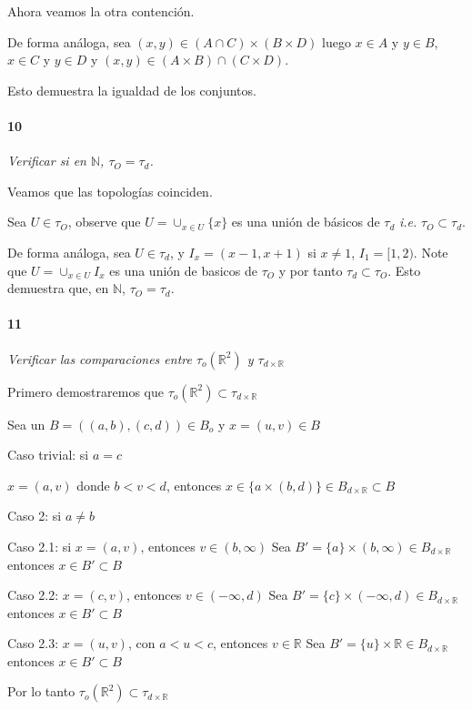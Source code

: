 \documentclass[12pt]{article}
\begin{document}
Ahora veamos la otra contención.

De forma análoga, sea $(x,y) \in (A \cap C) \times (B \times D)$ luego  $x \in A $ y $y \in B$, $x \in C$ y $y \in D$ y $(x,y) \in (A \times B) \cap (C \times D)$.

Esto demuestra la igualdad de los conjuntos.

\paragraph{10}
\textit{Verificar si en $\mathbb{N}$,  $\tau_O =\tau_d$.}

Veamos que las topologías coinciden.

Sea $U \in \tau_O$, observe que $U= \cup_{x\in U} \{x\}$ es una unión de básicos de $\tau_d$ \textit{i.e.} $\tau_O \subset \tau_d$.

De forma análoga, sea $U \in \tau_d$, y $I_x=(x-1,x+1)$ si $x \neq 1$, $I_1=[1,2)$. Note que $U=\cup_{x\in U} I_x$ es una unión de 
basicos de $\tau_O$ y por tanto $\tau_d \subset \tau_O$. Esto demuestra que, en $\mathbb{N}$, $\tau_O =\tau_d$.


\paragraph{11}
\textit{Verificar las comparaciones entre $\tau_o(\mathbb{R}^2)$ y $\tau_{d\times \mathbb{R}}$}

Primero demostraremos que $\tau_o(\mathbb{R}^2)\subset \tau_{d\times \mathbb{R}}$

Sea un $B=((a,b),(c,d))\in B_o$ y $x=(u,v)\in B$

Caso trivial: si $a=c$ 

$x=(a,v)$ donde $b<v<d$, entonces $x\in \{a\times (b,d)\}\in B_{d\times \mathbb{R}}\subset B$

Caso 2: si $a\neq b$

Caso 2.1: si 
$x=(a,v)$, entonces $v\in(b,\infty)$ Sea $B'=\{a\}\times (b,\infty)\in B_{d\times \mathbb{R}}$
entonces $x\in B'\subset B$

Caso 2.2: $x=(c,v)$, entonces $v\in(-\infty,d)$ Sea $B'=\{c\}\times (-\infty,d)\in B_{d\times \mathbb{R}}$
entonces $x\in B'\subset B$

Caso 2.3: $x=(u,v)$, con $a<u<c$, entonces $v\in\mathbb{R}$ Sea $B'=\{u\}\times\mathbb{R}\in B_{d\times \mathbb{R}}$
entonces $x\in B'\subset B$

Por lo tanto $\tau_o(\mathbb{R}^2)\subset \tau_{d\times \mathbb{R}}$
\end{document}
